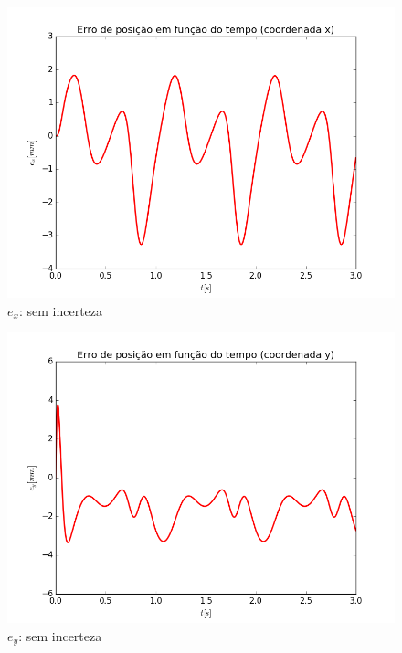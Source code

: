 \documentclass[]{politex}
\begin{document}
\begin{multicols}{2}
\begin{figure}[H]
	\centering
	\includegraphics[scale=0.40]{imagens/ex_0.png}  
	\caption{$e_x$: sem incerteza}
	\label{fig:ex_0}
\end{figure}
\begin{figure}[H]
	\centering
	\includegraphics[scale=0.40]{imagens/ey_0.png}  
	\caption{$e_y$: sem incerteza}
	\label{fig:ey_0}
\end{figure}
\end{multicols}
\end{document}
